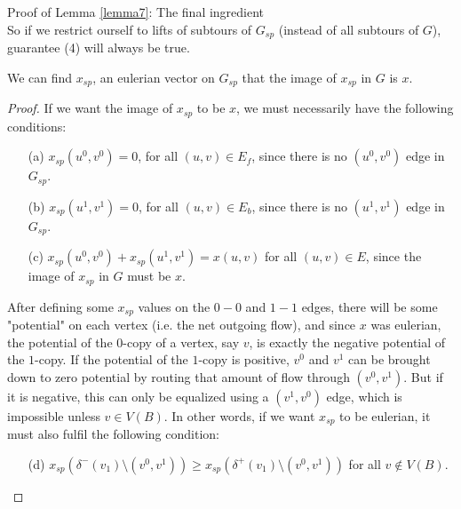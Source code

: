 \documentclass[./main.tex]{subfiles}
\begin{document}
\begin{subsection}{Proof of Lemma \ref{lemma7}: The final ingredient}
		\\So if we restrict ourself to lifts of subtours of $G_{sp}$ (instead of all subtours of $G$), guarantee (4) will always be true.\vspace{2mm}
		\begin{lemma}
		\label{lemma6-1}		We can find $x_{sp}$, an eulerian vector on $G_{sp}$ that the image of $x_{sp}$ in $G$ is $x$.
		\end{lemma}
		\begin{proof}
		If we want the image of $x_{sp}$ to be $x$, we must necessarily have the following conditions:
		\begin{itemize}
			\item[(a)] $x_{sp}(u^0,v^0) = 0$, for all $(u,v)\in E_f$, since there is no $(u^0,v^0)$ edge in $G_{sp}$.
			\item[(b)] $x_{sp}(u^1,v^1) = 0$, for all $(u,v)\in E_b$, since there is no $(u^1,v^1)$ edge in $G_{sp}$.
			\item[(c)] $x_{sp}(u^0,v^0)+x_{sp}(u^1,v^1) = x(u,v)$ for all $(u,v)\in E$, since the image of $x_{sp}$ in $G$ must be $x$.
		\end{itemize}
\vspace{2mm}
After defining some $x_{sp}$ values on the $0-0$ and $1-1$ edges, there will be some "potential" on each vertex (i.e. the net outgoing flow), and since $x$ was eulerian, the potential of the $0$-copy of a vertex, say $v$, is exactly the negative potential of the $1$-copy.
		If the potential of the $1$-copy is positive, $v^0$ and $v^1$ can be brought down to zero potential by routing that amount of flow through $(v^0,v^1)$. 
		But if it is negative, this can only be equalized using a $(v^1,v^0)$ edge, which is impossible unless $v\in V(B)$. In other words, if we want $x_{sp}$ to be eulerian, it must also fulfil the following condition:
		\begin{itemize}
			\item[(d)] $x_{sp}(\delta^-(v_1)\setminus (v^0,v^1) )\geq x_{sp}(\delta^+(v_1)\setminus (v^0,v^1))$ for all $v\notin V(B)$.
		\end{itemize}


\end{proof}
\end{subsection}
\end{document}
